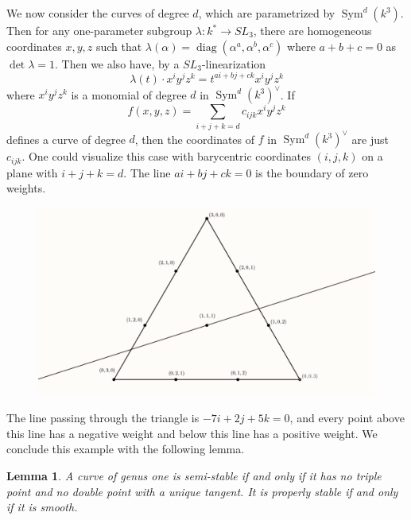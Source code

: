 \documentclass[12pt]{article}
\newtheorem{lemma}{Lemma}[section]
\theoremstyle{remark}
\theoremstyle{definition}
\newcommand{\Sym}[0]{\operatorname{Sym}}
\begin{document}
    We now consider the curves of degree $d$, which are parametrized by $\Sym^d(k^3)$. Then for any one-parameter subgroup $\lambda:k^*\to SL_3$, there are homogeneous coordinates $x,y,z$ such that $\lambda(\alpha)=\operatorname{diag}(\alpha^a,\alpha^b,\alpha^c)$ where $a+b+c=0$ as $\det\lambda=1$. Then we also have, by a $SL_3$-linearization
    \[\lambda(t)\cdot x^iy^jz^k=t^{ai+bj+ck}x^iy^jz^k\]
    where $x^iy^jz^k$ is a monomial of degree $d$ in $\Sym^d(k^3)^\vee$. If 
    \[f(x,y,z)=\sum_{i+j+k=d}c_{ijk}x^iy^jz^k\]
    defines a curve of degree $d$, then the coordinates of $f$ in $\Sym^d(k^3)^\vee$ are just $c_{ijk}$. One could visualize this case with barycentric coordinates $(i,j,k)$ on a plane with $i+j+k=d$. The line $ai+bj+ck=0$ is the boundary of zero weights.
    \begin{figure}[!h]
        \centering
        \includegraphics[width=15cm]{1}
    \end{figure}
    The line passing through the triangle is $-7i+2j+5k=0$, and every point above this line has a negative weight and below this line has a positive weight. We conclude this example with the following lemma.
    \begin{lemma}
        A curve of genus one is semi-stable if and only if it has no triple point and no double point with a unique tangent. It is properly stable if and only if it is smooth.
    \end{lemma}
\end{document}
